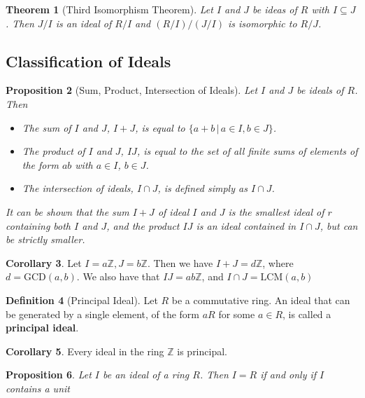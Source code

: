 \documentclass[10pt, oneside, reqno]{amsart}
\theoremstyle{plain}%
\newtheorem{thm}{Theorem}[section]
\newtheorem{prop}[thm]{Proposition}
\theoremstyle{definition}
\newtheorem{defn}[thm]{Definition}
\newtheorem{cor}[thm]{Corollary}
\theoremstyle{remark}
\newcommand{\Z}{\mathbb{Z}}
\begin{document}
\begin{thm}[Third Isomorphism Theorem]
	Let $I$ and $J$ be ideas of $R$ with $I \subseteq J$.  Then $J/I$ is an ideal of $R/I$ and $(R/I)/(J/I)$ is isomorphic to $R/J$. 
\end{thm}


\subsection{Classification of Ideals} %
\label{sub:classification_of_ideals}

\begin{prop}[Sum, Product, Intersection of Ideals]
	Let $I$ and $J$ be ideals of $R$.  Then
	\begin{itemize}
		\item The sum of $I$ and $J$, $I + J$, is equal to $\{ a + b \, | \, a \in I, b \in J \}$.
		\item The product of $I$ and $J$, $IJ$, is equal to the set of all finite sums of elements of the form $ab$ with $a \in I$, $b \in J$.
		\item The intersection of ideals, $I \cap J$, is defined simply as $I \cap J$.
	\end{itemize}

	It can be shown that the sum $I + J$ of ideal $I$ and $J$ is the smallest ideal of $r$ containing both $I$ and $J$, and the product $IJ$ is an ideal contained in $I \cap J$, but can be strictly smaller.
\end{prop}

\begin{cor}
	Let $I = a\Z, J = b\Z$.  Then we have $I + J = d\Z$, where $d  = \text{GCD}(a,b)$.  We also have that $IJ = ab \Z$, and $I \cap J = \text{LCM}(a,b)$ 
\end{cor}
\begin{defn}[Principal Ideal]
	Let $R$ be a commutative ring.  An ideal that can be generated by a single element, of the form $aR$ for some $a \in R$, is called a \textbf{principal ideal}. 
\end{defn}

\begin{cor}
	Every ideal in the ring $\Z$ is principal.
\end{cor}

\begin{prop}
	Let $I$ be an ideal of a ring $R$.  Then $I = R$ if and only if $I$ contains a unit
\end{prop}
\end{document}
